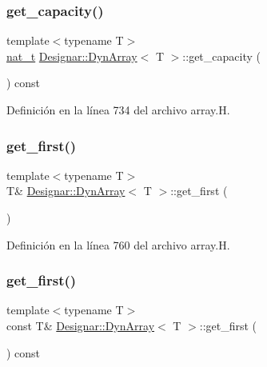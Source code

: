 \subsubsection{\texorpdfstring{get\+\_\+capacity()}{get\_capacity()}}
{\footnotesize\ttfamily template$<$typename T$>$ \\
\hyperlink{namespace_designar_aa72662848b9f4815e7bf31a7cf3e33d1}{nat\+\_\+t} \hyperlink{class_designar_1_1_dyn_array}{Designar\+::\+Dyn\+Array}$<$ T $>$\+::get\+\_\+capacity (\begin{DoxyParamCaption}{ }\end{DoxyParamCaption}) const\hspace{0.3cm}{\ttfamily [inline]}}



Definición en la línea 734 del archivo array.\+H.

\mbox{\label{class_designar_1_1_dyn_array_a85d8c50ef17c71d675961ba0268c2278}} 
\subsubsection{\texorpdfstring{get\+\_\+first()}{get\_first()}\hspace{0.1cm}{\footnotesize\ttfamily [1/2]}}
{\footnotesize\ttfamily template$<$typename T$>$ \\
T\& \hyperlink{class_designar_1_1_dyn_array}{Designar\+::\+Dyn\+Array}$<$ T $>$\+::get\+\_\+first (\begin{DoxyParamCaption}{ }\end{DoxyParamCaption})\hspace{0.3cm}{\ttfamily [inline]}}



Definición en la línea 760 del archivo array.\+H.

\mbox{\label{class_designar_1_1_dyn_array_a0b8735deaef51cfc0ff7c84994c3d838}} 
\subsubsection{\texorpdfstring{get\+\_\+first()}{get\_first()}\hspace{0.1cm}{\footnotesize\ttfamily [2/2]}}
{\footnotesize\ttfamily template$<$typename T$>$ \\
const T\& \hyperlink{class_designar_1_1_dyn_array}{Designar\+::\+Dyn\+Array}$<$ T $>$\+::get\+\_\+first (\begin{DoxyParamCaption}{ }\end{DoxyParamCaption}) const\hspace{0.3cm}{\ttfamily [inline]}}



